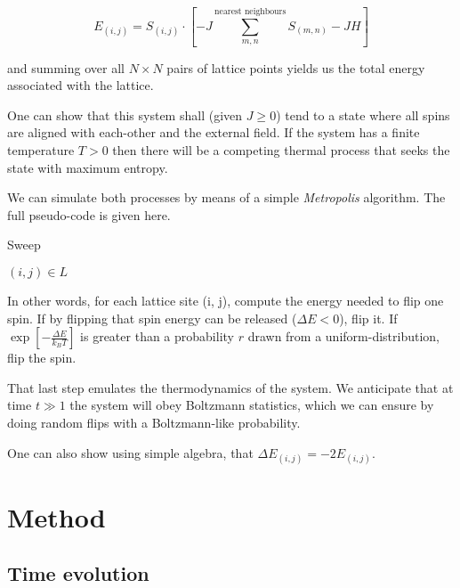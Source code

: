 \documentclass[11pt]{article}
\begin{document}
\begin{equation}\label{eq:point_energy}
  E_{(i, j)} = S_{(i, j)} \cdot \left[ -J  \sum_{m, n}^{\text{nearest neighbours}} S_{(m,n)} - JH \right] 
\end{equation}

and summing over all \(N \times N\) pairs of lattice points yields us the total energy associated with the lattice.

One can show that this system shall (given \(J \geq 0\)) tend to a state where all spins are aligned with each-other and the external field. If the system has a finite temperature \(T>0\) then there will be a competing thermal process that seeks the state with maximum entropy.

We can simulate both processes by means of a simple \emph{Metropolis} algorithm. The full pseudo-code is given here.

\begin{algorithm}
  \caption{Sweep}\label{euclid}
\begin{algorithmic}[1]
  \For{} \( (i, j) \in L \)
  \EndIf
  \EndFor
  \EndProcedure
\end{algorithmic}
\end{algorithm}

In other words, for each lattice site (i, j), compute the energy needed to flip one spin. If by flipping that spin energy can be released (\(\Delta E < 0\)), flip it. If \(\exp \left[ - \frac{\Delta E }{ k_B T} \right] \) is greater than a probability \(r \) drawn from a uniform-distribution, flip the spin.

That last step emulates the thermodynamics of the system. We anticipate that at time \( t \gg 1\)  the system will obey Boltzmann statistics, which we can ensure by doing random flips with a Boltzmann-like probability.

One can also show using simple algebra, that \(\Delta E_{(i, j)} = -2 E_{(i, j)}\).

\section{Method}\label{sec:simulation_data}

\subsection{Time evolution}\label{sec:time_evolution}
\end{document}
